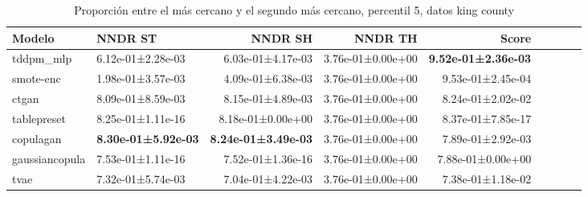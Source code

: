\begin{table}[H]
\centering
\fontsize{10}{14}\selectfont
\caption{Proporción entre el más cercano y el segundo más cercano, percentil 5, datos king county}
\label{table-dcr-king county-a}
\begin{tabular}{|l|l|r|r|r|r|r|r|r|}
\hline
\rowcolor[gray]{0.8}
Modelo & NNDR ST & NNDR SH & NNDR TH & \textbf{Score} \\
\hline tddpm\_mlp & 6.12e-01±2.28e-03 & 6.03e-01±4.17e-03 & 3.76e-01±0.00e+00 & \bfseries 9.52e-01±2.36e-03 \\
\hline smote-enc & \cellcolor[rgb]{0.9, 0.54, 0.52} 1.98e-01±3.57e-03 & \cellcolor[rgb]{0.9, 0.54, 0.52} 4.09e-01±6.38e-03 & 3.76e-01±0.00e+00 & 9.53e-01±2.45e-04 \\
\hline ctgan & 8.09e-01±8.59e-03 & 8.15e-01±4.89e-03 & 3.76e-01±0.00e+00 & 8.24e-01±2.02e-02 \\
\hline tablepreset & 8.25e-01±1.11e-16 & 8.18e-01±0.00e+00 & 3.76e-01±0.00e+00 & 8.37e-01±7.85e-17 \\
\hline copulagan & \bfseries 8.30e-01±5.92e-03 & \bfseries 8.24e-01±3.49e-03 & 3.76e-01±0.00e+00 & 7.89e-01±2.92e-03 \\
\hline gaussiancopula & 7.53e-01±1.11e-16 & 7.52e-01±1.36e-16 & 3.76e-01±0.00e+00 & 7.88e-01±0.00e+00 \\
\hline tvae & 7.32e-01±5.74e-03 & 7.04e-01±4.22e-03 & 3.76e-01±0.00e+00 & \cellcolor[rgb]{0.9, 0.54, 0.52} 7.38e-01±1.18e-02 \\
\hline
\end{tabular}
\end{table}

